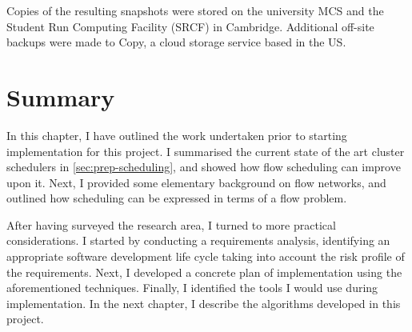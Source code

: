 Copies of the resulting snapshots were stored on the university MCS and the Student Run Computing Facility (SRCF) in Cambridge. Additional off-site backups were made to Copy, a cloud storage service based in the US.


\section{Summary}

In this chapter, I have outlined the work undertaken prior to starting implementation for this project. I summarised the current state of the art cluster schedulers in \cref{sec:prep-scheduling}, and showed how flow scheduling can improve upon it. Next, I provided some elementary background on flow networks, and outlined how scheduling can be expressed in terms of a flow problem.

After having surveyed the research area, I turned to more practical considerations. I started by conducting a requirements analysis, identifying an appropriate software development life cycle taking into account the risk profile of the requirements. Next, I developed a concrete plan of implementation using the aforementioned techniques. Finally, I identified the tools I would use during implementation. In the next chapter, I describe the algorithms developed in this project.